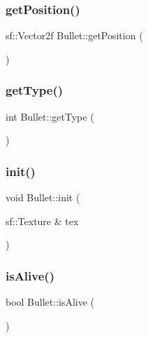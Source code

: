 \hypertarget{class_bullet_a64e4ce634f62ab31d338bd142c1987c9}{}\label{class_bullet_a64e4ce634f62ab31d338bd142c1987c9} 
\subsubsection{\texorpdfstring{get\+Position()}{getPosition()}}
{\footnotesize\ttfamily sf\+::\+Vector2f Bullet\+::get\+Position (\begin{DoxyParamCaption}{ }\end{DoxyParamCaption})}

\hypertarget{class_bullet_a73634149134359bca3f2201fb6284707}{}\label{class_bullet_a73634149134359bca3f2201fb6284707} 
\subsubsection{\texorpdfstring{get\+Type()}{getType()}}
{\footnotesize\ttfamily int Bullet\+::get\+Type (\begin{DoxyParamCaption}{ }\end{DoxyParamCaption})}

\hypertarget{class_bullet_a0a0740a3138524771a496847f7198cf4}{}\label{class_bullet_a0a0740a3138524771a496847f7198cf4} 
\subsubsection{\texorpdfstring{init()}{init()}}
{\footnotesize\ttfamily void Bullet\+::init (\begin{DoxyParamCaption}\item[{sf\+::\+Texture \&}]{tex }\end{DoxyParamCaption})}

\hypertarget{class_bullet_ae23f1f04ccd644d823184feb0da3c6b2}{}\label{class_bullet_ae23f1f04ccd644d823184feb0da3c6b2} 
\subsubsection{\texorpdfstring{is\+Alive()}{isAlive()}}
{\footnotesize\ttfamily bool Bullet\+::is\+Alive (\begin{DoxyParamCaption}{ }\end{DoxyParamCaption})}

